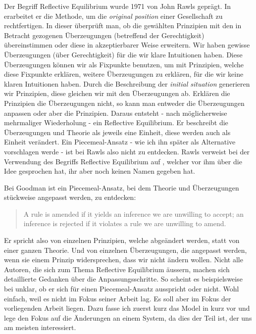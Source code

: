 \documentclass{article}
\begin{document}
Der Begriff Reflective Equilibrium wurde 1971 von John Rawls geprägt. In \autocite{rawls_theory_1971} erarbeitet er die Methode, um die \textit{original position} einer Gesellschaft zu rechtfertigen. In dieser überprüft man, ob die gewählten Prinzipien mit den in Betracht gezogenen Überzeugungen (betreffend der Gerechtigkeit) übereinstimmen oder diese in akzeptierbarer Weise erweitern. Wir haben gewisse Überzeugungen (über Gerechtigkeit) für die wir klare Intuitionen haben. Diese Überzeugungen können wir als Fixpunkte benutzen, um mit Prinzipien, welche diese Fixpunkte erklären, weitere Überzeugungen zu erklären, für die wir keine klaren Intuitionen haben. Durch die Beschreibung der \textit{initial situation} generieren wir Prinzipien, diese gleichen wir mit den Überzeugungen ab. Erklären die Prinzipien die Überzeugungen nicht, so kann man entweder die Überzeugungen anpassen oder aber die Prinzipien. Daraus entsteht - nach möglicherweise mehrmaliger Wiederholung - ein Reflective Equilibrium. Er beschreibt die Überzeugungen und Theorie als jeweils eine Einheit, diese werden auch als Einheit verändert. Ein Piecemeal-Ansatz - wie ich ihn später als Alternative vorschlagen werde - ist bei Rawls also nicht zu entdecken. Rawls verweist bei der Verwendung des Begriffs Reflective Equilibrium auf \cite{goodman_fact_1983}, welcher vor ihm über die Idee gesprochen hat, ihr aber noch keinen Namen gegeben hat. \autocite[S.~20]{rawls_theory_1971}

Bei Goodman ist ein Piecemeal-Ansatz, bei dem Theorie und Überzeugungen stückweise angepasst werden, zu entdecken:

\begin{quote}
    A rule is amended if it yields an inference we are unwilling to accept; an inference is rejected if it violates a rule we are unwilling to amend. \autocite[S.~64]{goodman_fact_1983}
\end{quote}

Er spricht also von einzelnen Prinzipien, welche abgeändert werden, statt von einer ganzen Theorie. Und von einzelnen Überzeugungen, die angepasst werden, wenn sie einem Prinzip widersprechen, dass wir nicht ändern wollen. Nicht alle Autoren, die sich zum Thema Reflective Equilibrium äussern, machen sich detaillierte Gedanken über die Anpassungsschritte. So scheint es beispielsweise bei \autocite{tersman_reflective_1993} unklar, ob er sich für einen Piecemeal-Ansatz ausspricht oder nicht. Wohl einfach, weil es nicht im Fokus seiner Arbeit lag. Es soll aber im Fokus der vorliegenden Arbeit liegen. Dazu fasse ich zuerst kurz das Model in \citeauthor{beisbart_making_2015} kurz vor und lege den Fokus auf die Änderungen an einem System, da dies der Teil ist, der uns am meisten interessiert.
\end{document}
